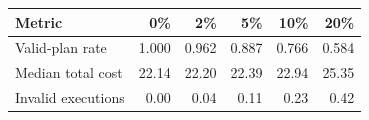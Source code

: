 \begin{tabular}{lrrrrr}
\toprule
Metric & 0\% & 2\% & 5\% & 10\% & 20\% \\
\midrule
Valid-plan rate & 1.000 & 0.962 & 0.887 & 0.766 & 0.584 \\
Median total cost & 22.14 & 22.20 & 22.39 & 22.94 & 25.35 \\
Invalid executions & 0.00 & 0.04 & 0.11 & 0.23 & 0.42 \\
\bottomrule
\end{tabular}
